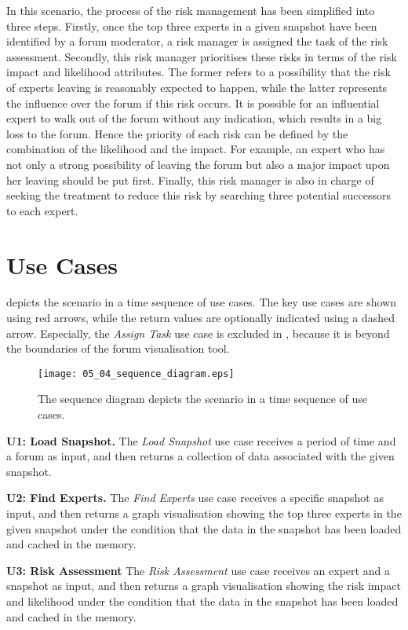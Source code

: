 In this scenario, the process of the risk management has been simplified into three steps. Firstly, once the top three experts in a given snapshot have been identified by a forum moderator, a risk manager is assigned the task of the risk assessment. Secondly, this risk manager prioritises these risks in terms of the risk impact and likelihood attributes. The former refers to a possibility that the risk of experts leaving is reasonably expected to happen, while the latter represents the influence over the forum if this risk occurs. It is possible for an influential expert to walk out of the forum without any indication, which results in a big loss to the forum. Hence the priority of each risk can be defined by the combination of the likelihood and the impact. For example, an expert who has not only a strong possibility of leaving the forum but also a major impact upon her leaving should be put first. Finally, this risk manager is also in charge of seeking the treatment to reduce this risk by searching three potential successors to each expert.

\section{Use Cases} \label{sec:use_cases}
 depicts the scenario in a time sequence of use cases. The key use cases are shown using red arrows, while the return values are optionally indicated using a dashed arrow. Especially, the \emph{Assign Task} use case is excluded in , because it is beyond the boundaries of the forum visualisation tool.

\begin{figure}[!htb]
  \centering
  \texttt{[image: 05\_04\_sequence\_diagram.eps]}
  \caption{The sequence diagram depicts the scenario in a time sequence of use cases.}
  \label{Figure:05_04}
\end{figure}

\textbf{U1: Load Snapshot.}
The \emph{Load Snapshot} use case receives a period of time and a forum as input, and then returns a collection of data associated with the given snapshot.

\textbf{U2: Find Experts.}
The \emph{Find Experts} use case receives a specific snapshot as input, and then returns a graph visualisation showing the top three experts in the given snapshot under the condition that the data in the snapshot has been loaded and cached in the memory.

\textbf{U3: Risk Assessment}
The \emph{Risk Assessment} use case receives an expert and a snapshot as input, and then returns a graph visualisation showing the risk impact and likelihood under the condition that the data in the snapshot has been loaded and cached in the memory.

